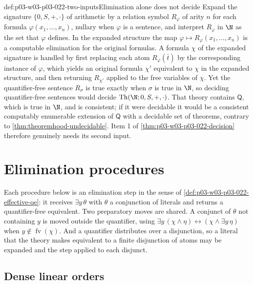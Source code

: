 \begin{hbwarning}{def:p03-w03-p03-022-two-inputs}{Elimination alone does not decide}
Expand the signature \(\{0,S,+,\cdot\}\) of arithmetic by a relation symbol
\(R_\varphi\) of arity \(n\) for each formula \(\varphi(x_1,\ldots,x_n)\),
nullary when \(\varphi\) is a sentence, and interpret \(R_\varphi\) in
\(\N\) as the set that \(\varphi\) defines. In the expanded structure the
map \(\varphi\mapsto R_\varphi(x_1,\ldots,x_n)\) is a computable elimination
for the original formulas. A formula \(\chi\) of the expanded signature is
handled by first replacing each atom \(R_\varphi(\bar t)\) by the
corresponding instance of \(\varphi\), which yields an original formula
\(\chi'\) equivalent to \(\chi\) in the expanded structure, and then
returning \(R_{\chi'}\) applied to the free variables of \(\chi\).
Yet the quantifier-free sentence \(R_\sigma\) is true
exactly when \(\sigma\) is true in \(\N\), so deciding quantifier-free
sentences would decide \(\operatorname{Th}(\N;0,S,+,\cdot)\). That theory
contains \(\mathsf Q\), which is true in \(\N\), and is consistent; if it were
decidable it would be a consistent computably enumerable extension of
\(\mathsf Q\) with a decidable set of theorems, contrary to
\cref{thm:theoremhood-undecidable}. Item 1 of
\cref{thm:p03-w03-p03-022-decision} therefore genuinely needs its second
input.
\end{hbwarning}

\section{Elimination procedures}
\label{sec:p03-w03-p03-022-procedures}

Each procedure below is an elimination step in the sense of
\cref{def:p03-w03-p03-022-effective-qe}: it receives
\(\exists y\,\theta\) with \(\theta\) a conjunction of literals and returns a
quantifier-free equivalent. Two preparatory moves are shared. A conjunct of
\(\theta\) not containing \(y\) is moved outside the quantifier, using
\(\exists y\,(\chi\land\eta)\leftrightarrow(\chi\land\exists y\,\eta)\) when
\(y\notin\operatorname{fv}(\chi)\). And a quantifier distributes over a
disjunction, so a literal that the theory makes equivalent to a finite
disjunction of atoms may be expanded and the step applied to each disjunct.

\subsection{Dense linear orders}

